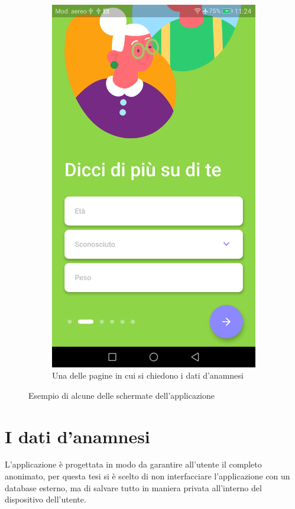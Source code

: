 \begin{figure}
\begin{subfigure}[b]{0.33\textwidth}
      \includegraphics[width=\textwidth]{figures/screenshot/general_info.png}
      \caption{Una delle pagine in cui si chiedono i dati d'anamnesi}
      \label{fig:onboarding}
  \end{subfigure}
  \caption{Esempio di alcune delle schermate dell'applicazione}
  \label{fig:accelerometer_gyroscope}
\end{figure}

\newpage
\section{I dati d'anamnesi}
L'applicazione è progettata in modo da garantire all'utente il completo anonimato, per questa tesi si è scelto di non interfacciare l'applicazione con un database esterno, ma di salvare tutto in maniera privata all'interno del dispositivo dell'utente.

